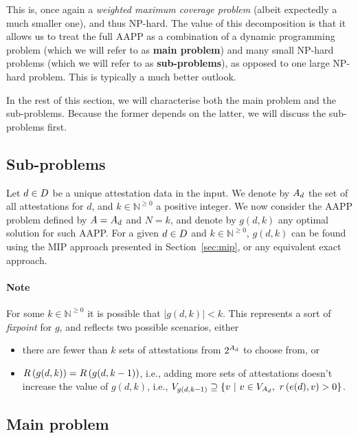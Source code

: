 \documentclass{article}
\begin{document}
This is, once again a \emph{weighted maximum coverage problem} (albeit
expectedly a much smaller one), and thus NP-hard. The value of this
decomposition is that it allows us to treat the full AAPP as a combination of a
dynamic programming problem (which we will refer to as \textbf{main problem})
and many small NP-hard problems (which we will refer to as
\textbf{sub-problems}), as opposed to one large NP-hard problem. This is
typically a much better outlook.

In the rest of this section, we will characterise both the main problem and the
sub-problems. Because the former depends on the latter, we will discuss the
sub-problems first.

\subsection{Sub-problems}

Let $d \in D$ be a unique attestation data in the input. We denote by
$A_{d}$ the set of all attestations for $d$, and $k \in
\mathbb{N}^{\geq 0}$ a positive integer. We now consider the AAPP problem
defined by $A = A_{d}$ and $N = k$, and denote by $g(d, k)$ any
optimal solution for such AAPP. For a given $d \in D$ and $k \in
\mathbb{N}^{\geq 0}$, $g(d, k)$ can be found using the MIP approach presented
in Section~\ref{sec:mip}, or any equivalent exact approach. 

\paragraph{Note} For some $k \in \mathbb{N}^{\geq 0}$ it is possible that
$|g(d, k)| < k$. This represents a sort of \emph{fixpoint} for $g$, and
reflects two possible scenarios, either
%
\begin{itemize}
  \item there are fewer than $k$ sets of attestations from
  $2^{A_{d}}$ to choose from, or
  \item $R\left(g(d, k)\right) = R\left(g(d, k-1)\right)$, i.e., adding more sets of
  attestations doesn't increase the value of $g(d, k)$, i.e., $V_{g(d,
  k-1)} \supseteq \{ v~|~v\in V_{A_{d}},~
  r\left(e(d), v\right) > 0 \}$.
\end{itemize}
%

\subsection{Main problem}
\end{document}
